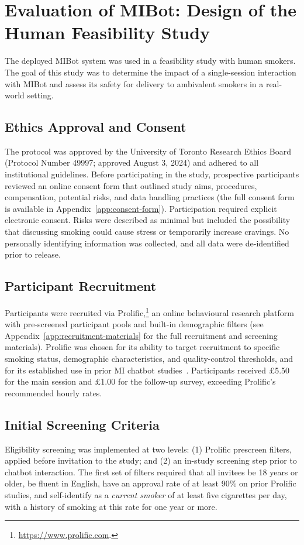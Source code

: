\chapter{Evaluation of MIBot: Design of the Human Feasibility Study}
\label{ch:feasibility}
\label{ch:mibot-feasibility-study}
The deployed MIBot system was used in a feasibility study with human smokers. The goal of this study was to determine the impact of a single-session interaction with MIBot and assess its safety for delivery to ambivalent smokers in a real-world setting.

\section{Ethics Approval and Consent}
The protocol was approved by the University of Toronto Research Ethics Board (Protocol Number 49997; approved August 3, 2024) \citep{rose2025ethics} and adhered to all institutional guidelines. Before participating in the study, prospective participants reviewed an online consent form that outlined study aims, procedures, compensation, potential risks, and data handling practices (the full consent form is available in Appendix~\ref{app:consent-form}). Participation required explicit electronic consent. Risks were described as minimal but included the possibility that discussing smoking could cause stress or temporarily increase cravings. No personally identifying information was collected, and all data were de-identified prior to release.

\section{Participant Recruitment}
\label{sec:recruitment}
Participants were recruited via Prolific,\footnote{\url{https://www.prolific.com}.} an online behavioural research platform with pre-screened participant pools and built-in demographic filters (see Appendix~\ref{app:recruitment-materials} for the full recruitment and screening materials). Prolific was chosen for its ability to target recruitment to specific smoking status, demographic characteristics, and quality-control thresholds, and for its established use in prior MI chatbot studies~\citep{brown2023mi,info:doi/10.2196/20251}. Participants received \pounds5.50 for the main session and \pounds1.00 for the follow-up survey, exceeding Prolific's recommended hourly rates.


\section{Initial Screening Criteria}
Eligibility screening was implemented at two levels: (1) Prolific prescreen filters, applied before invitation to the study; and (2) an in-study screening step prior to chatbot interaction. The first set of filters required that all invitees be 18 years or older, be fluent in English, have an approval rate of at least 90\% on prior Prolific studies, and self-identify as a \emph{current smoker} of at least five cigarettes per day, with a history of smoking at this rate for one year or more.

